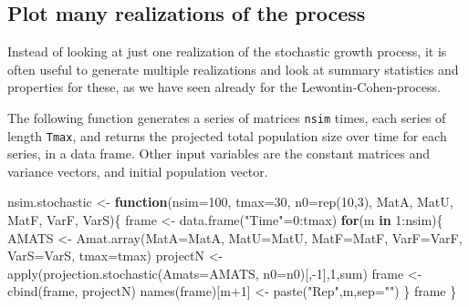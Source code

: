 \documentclass[
]{book}
\newenvironment{Shaded}{\begin{snugshade}}{\end{snugshade}}
\newcommand{\AttributeTok}[1]{\textcolor[rgb]{0.77,0.63,0.00}{#1}}
\newcommand{\ControlFlowTok}[1]{\textcolor[rgb]{0.13,0.29,0.53}{\textbf{#1}}}
\newcommand{\DecValTok}[1]{\textcolor[rgb]{0.00,0.00,0.81}{#1}}
\newcommand{\FunctionTok}[1]{\textcolor[rgb]{0.00,0.00,0.00}{#1}}
\newcommand{\NormalTok}[1]{#1}
\newcommand{\OtherTok}[1]{\textcolor[rgb]{0.56,0.35,0.01}{#1}}
\newcommand{\SpecialCharTok}[1]{\textcolor[rgb]{0.00,0.00,0.00}{#1}}
\newcommand{\StringTok}[1]{\textcolor[rgb]{0.31,0.60,0.02}{#1}}
\begin{document}
\hypertarget{plot-many-realizations-of-the-process-1}{%
\subsection*{Plot many realizations of the process}\label{plot-many-realizations-of-the-process-1}}

Instead of looking at just one realization of the stochastic growth process, it is often useful to generate multiple realizations and look at summary statistics and properties for these, as we have seen already for the Lewontin-Cohen-process.

The following function generates a series of matrices \texttt{nsim} times, each series of length \texttt{Tmax}, and returns the projected total population size over time for each series, in a data frame. Other input variables are the constant matrices and variance vectors, and initial population vector.

\begin{Shaded}
\begin{Highlighting}[]
\NormalTok{nsim.stochastic }\OtherTok{\textless{}{-}} \ControlFlowTok{function}\NormalTok{(}\AttributeTok{nsim=}\DecValTok{100}\NormalTok{, }
                            \AttributeTok{tmax=}\DecValTok{30}\NormalTok{, }
                            \AttributeTok{n0=}\FunctionTok{rep}\NormalTok{(}\DecValTok{10}\NormalTok{,}\DecValTok{3}\NormalTok{), }
\NormalTok{                            MatA, }
\NormalTok{                            MatU, }
\NormalTok{                            MatF, }
\NormalTok{                            VarF, }
\NormalTok{                            VarS)\{}
\NormalTok{  frame }\OtherTok{\textless{}{-}}  \FunctionTok{data.frame}\NormalTok{(}\StringTok{"Time"}\OtherTok{=}\DecValTok{0}\SpecialCharTok{:}\NormalTok{tmax)}
  \ControlFlowTok{for}\NormalTok{(m }\ControlFlowTok{in} \DecValTok{1}\SpecialCharTok{:}\NormalTok{nsim)\{}
\NormalTok{  AMATS }\OtherTok{\textless{}{-}} \FunctionTok{Amat.array}\NormalTok{(}\AttributeTok{MatA=}\NormalTok{MatA, }
                      \AttributeTok{MatU=}\NormalTok{MatU, }
                      \AttributeTok{MatF=}\NormalTok{MatF, }
                      \AttributeTok{VarF=}\NormalTok{VarF, }
                      \AttributeTok{VarS=}\NormalTok{VarS, }
                      \AttributeTok{tmax=}\NormalTok{tmax)}
\NormalTok{   projectN }\OtherTok{\textless{}{-}} \FunctionTok{apply}\NormalTok{(}\FunctionTok{projection.stochastic}\NormalTok{(}\AttributeTok{Amats=}\NormalTok{AMATS, }
                                           \AttributeTok{n0=}\NormalTok{n0)[,}\SpecialCharTok{{-}}\DecValTok{1}\NormalTok{],}\DecValTok{1}\NormalTok{,sum)}
\NormalTok{  frame }\OtherTok{\textless{}{-}} \FunctionTok{cbind}\NormalTok{(frame, projectN)}
  \FunctionTok{names}\NormalTok{(frame)[m}\SpecialCharTok{+}\DecValTok{1}\NormalTok{] }\OtherTok{\textless{}{-}} \FunctionTok{paste}\NormalTok{(}\StringTok{"Rep"}\NormalTok{,m,}\AttributeTok{sep=}\StringTok{""}\NormalTok{)}
\NormalTok{  \}}
\NormalTok{  frame}
\NormalTok{\}}
\end{Highlighting}
\end{Shaded}
\end{document}
